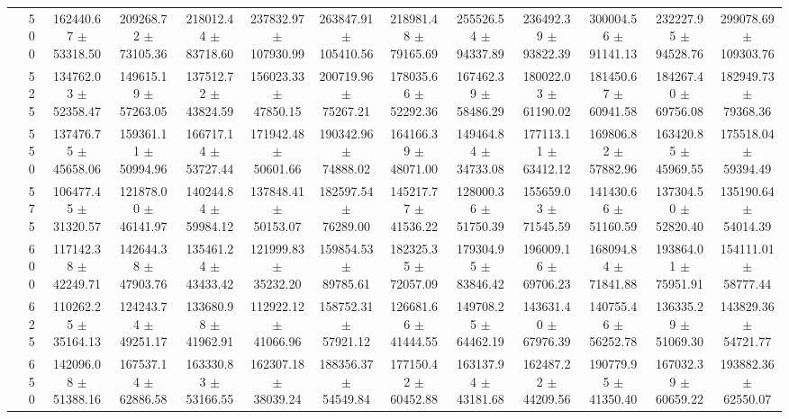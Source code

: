 \begin{table}[h]
{\begin{tabular}{
        ccccccccccccc}
 & 500& 162440.67 $\pm$ 53318.50& 209268.72 $\pm$ 73105.36& 218012.44 $\pm$ 83718.60& 237832.97 $\pm$ 107930.99& 263847.91 $\pm$ 105410.56& 218981.48 $\pm$ 79165.69& 255526.54 $\pm$ 94337.89& 236492.39 $\pm$ 93822.39& 300004.56 $\pm$ 91141.13& 232227.95 $\pm$ 94528.76& 299078.69 $\pm$ 109303.76 \\ 
 & 525& 134762.03 $\pm$ 52358.47& 149615.19 $\pm$ 57263.05& 137512.72 $\pm$ 43824.59& 156023.33 $\pm$ 47850.15& 200719.96 $\pm$ 75267.21& 178035.66 $\pm$ 52292.36& 167462.39 $\pm$ 58486.29& 180022.03 $\pm$ 61190.02& 181450.67 $\pm$ 60941.58& 184267.40 $\pm$ 69756.08& 182949.73 $\pm$ 79368.36 \\ 
 & 550& 137476.75 $\pm$ 45658.06& 159361.11 $\pm$ 50994.96& 166717.14 $\pm$ 53727.44& 171942.48 $\pm$ 50601.66& 190342.96 $\pm$ 74888.02& 164166.39 $\pm$ 48071.00& 149464.84 $\pm$ 34733.08& 177113.11 $\pm$ 63412.12& 169806.82 $\pm$ 57882.96& 163420.85 $\pm$ 45969.55& 175518.04 $\pm$ 59394.49 \\ 
 & 575& 106477.45 $\pm$ 31320.57& 121878.00 $\pm$ 46141.97& 140244.84 $\pm$ 59984.12& 137848.41 $\pm$ 50153.07& 182597.54 $\pm$ 76289.00& 145217.77 $\pm$ 41536.22& 128000.36 $\pm$ 51750.39& 155659.03 $\pm$ 71545.59& 141430.66 $\pm$ 51160.59& 137304.50 $\pm$ 52820.40& 135190.64 $\pm$ 54014.39 \\ 
 & 600& 117142.38 $\pm$ 42249.71& 142644.38 $\pm$ 47903.76& 135461.24 $\pm$ 43433.42& 121999.83 $\pm$ 35232.20& 159854.53 $\pm$ 89785.61& 182325.35 $\pm$ 72057.09& 179304.95 $\pm$ 83846.42& 196009.16 $\pm$ 69706.23& 168094.84 $\pm$ 71841.88& 193864.01 $\pm$ 75951.91& 154111.01 $\pm$ 58777.44 \\ 
 & 625& 110262.25 $\pm$ 35164.13& 124243.74 $\pm$ 49251.17& 133680.98 $\pm$ 41962.91& 112922.12 $\pm$ 41066.96& 158752.31 $\pm$ 57921.12& 126681.66 $\pm$ 41444.55& 149708.25 $\pm$ 64462.19& 143631.40 $\pm$ 67976.39& 140755.46 $\pm$ 56252.78& 136335.29 $\pm$ 51069.30& 143829.36 $\pm$ 54721.77 \\ 
 & 650& 142096.08 $\pm$ 51388.16& 167537.14 $\pm$ 62886.58& 163330.83 $\pm$ 53166.55& 162307.18 $\pm$ 38039.24& 188356.37 $\pm$ 54549.84& 177150.42 $\pm$ 60452.88& 163137.94 $\pm$ 43181.68& 162487.22 $\pm$ 44209.56& 190779.95 $\pm$ 41350.40& 167032.39 $\pm$ 60659.22& 193882.36 $\pm$ 62550.07 \\ \hline 

        \end{tabular}%
        }

        \end{table}
        
